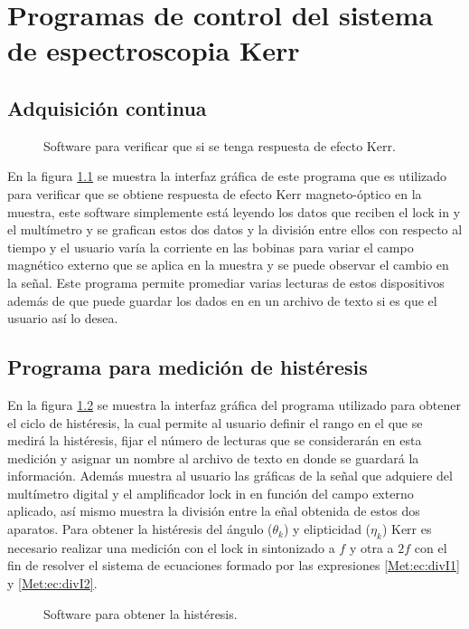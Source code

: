 \chapter{Programas de control del sistema de espectroscopia Kerr} \label{AppKerrAuto}
\section{Adquisición continua}
\begin{figure}[!hbt]
	\centering
	\caption[Interfaz gr\'afica del software utilizado para verificar la se\~nal.]{Software para verificar que si se tenga respuesta de efecto Kerr. }
	\label{Lab:fig:continuo}
\end{figure} 
En la figura \ref{Lab:fig:continuo} se muestra la interfaz gr\'afica de este programa que es utilizado para verificar que se obtiene respuesta de efecto Kerr magneto-\'optico en la muestra, este software simplemente est\'a leyendo los datos que reciben el lock in y el mult\'imetro y se grafican estos dos datos y la divisi\'on entre ellos  con respecto al tiempo y el usuario var\'ia la corriente en las bobinas para variar el campo magn\'etico externo que se aplica en la muestra y se puede observar el cambio en la se\~nal. Este programa permite promediar varias lecturas de estos dispositivos adem\'as de que puede guardar los dados en en un archivo de texto si es que el usuario as\'i lo desea.

\section{Programa para medici\'on de hist\'eresis}
En la figura \ref{Lab:fig:mk} se muestra la interfaz gr\'afica del programa utilizado para obtener el ciclo de hist\'eresis, la cual permite al usuario definir el rango en el que se medir\'a la hist\'eresis, fijar el n\'umero de lecturas que se considerar\'an en esta medici\'on y asignar un nombre al archivo de texto en donde se guardar\'a la informaci\'on. Adem\'as muestra al usuario las gr\'aficas de la se\~nal que adquiere del mult\'imetro digital y el amplificador lock in en funci\'on del campo externo aplicado, as\'i mismo muestra la divisi\'on entre la e\~nal obtenida de estos dos aparatos. Para obtener la hist\'eresis del \'angulo ($\theta_k$) y elipticidad ($\eta_k$) Kerr es necesario realizar una medici\'on con el lock in sintonizado a $f$ y otra a $2f$ con el fin de resolver el sistema de ecuaciones formado por las expresiones \ref{Met:ec:divI1} y \ref{Met:ec:divI2}. 
\begin{figure}[!hbt]
	\centering
	\caption[Interfaz gr\'afica del software utilizado para obtener la hist\'eresis.]{Software para obtener la hist\'eresis. }
	\label{Lab:fig:mk}
\end{figure}
